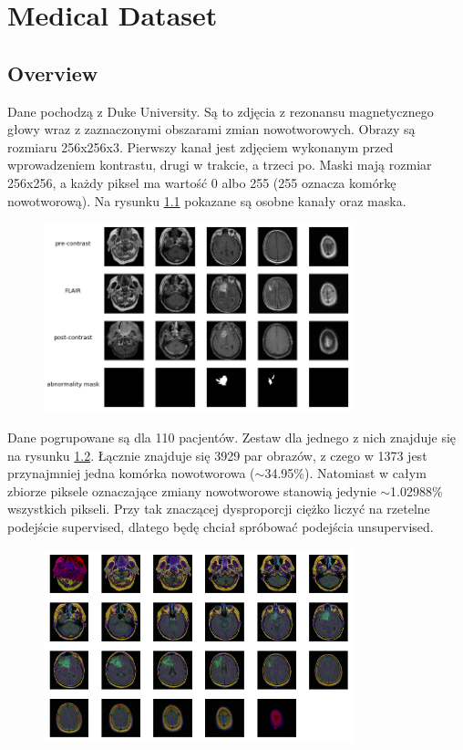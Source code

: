 \chapter{Medical Dataset}

\section{Overview}

Dane pochodzą z Duke University. Są to zdjęcia z rezonansu magnetycznego głowy wraz z zaznaczonymi obszarami zmian nowotworowych. Obrazy są rozmiaru 256x256x3. Pierwszy kanał jest zdjęciem wykonanym przed wprowadzeniem kontrastu, drugi w trakcie, a trzeci po. Maski mają rozmiar 256x256, a każdy piksel ma wartość 0 albo 255 (255 oznacza komórkę nowotworową). Na rysunku \ref{fig:medical_description} pokazane są osobne kanały oraz maska.

\begin{figure}[h!]
    \centering
    \includegraphics[width=0.8\textwidth]{images/medical_description}
    \caption{}
    \label{fig:medical_description}
\end{figure}

Dane pogrupowane są dla 110 pacjentów. Zestaw dla jednego z nich znajduje się na rysunku \ref{fig:medical_sample}. Łącznie znajduje się 3929 par obrazów, z czego w 1373 jest przynajmniej jedna komórka nowotworowa ($\sim$34.95\%). Natomiast w całym zbiorze piksele oznaczające zmiany nowotworowe stanowią jedynie $\sim$1.02988\% wszystkich pikseli. Przy tak znaczącej dysproporcji ciężko liczyć na rzetelne podejście supervised, dlatego będę chciał spróbować podejścia unsupervised.

\begin{figure}[h!]
    \centering
    \includegraphics[width=0.8\textwidth]{images/medical_sample}
    \caption{}
    \label{fig:medical_sample}
\end{figure}

